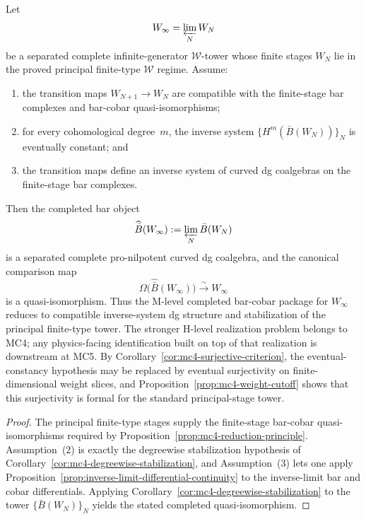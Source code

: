 \begin{proposition}
\label{prop:winfty-mc4-criterion}
Let
\[
W_\infty = \varprojlim_N W_N
\]
be a separated complete infinite-generator $\mathcal{W}$-tower whose
finite stages $W_N$ lie in the proved principal finite-type
$\mathcal{W}$ regime.  Assume:
\begin{enumerate}
\item the transition maps $W_{N+1} \to W_N$ are compatible with the
  finite-stage bar complexes and bar-cobar quasi-isomorphisms;
\item for every cohomological degree~$m$, the inverse system
  $\{H^m(\bar B(W_N))\}_N$ is eventually constant; and
\item the transition maps define an inverse system of curved dg
  coalgebras on the finite-stage bar complexes.
\end{enumerate}
Then the completed bar object
\[
\widehat{\bar B}(W_\infty) := \varprojlim_N \bar B(W_N)
\]
is a separated complete pro-nilpotent curved dg coalgebra, and the
canonical comparison map
\[
\Omega\bigl(\widehat{\bar B}(W_\infty)\bigr) \xrightarrow{\sim} W_\infty
\]
is a quasi-isomorphism.  Thus the M-level completed bar-cobar package
for $W_\infty$ reduces to compatible inverse-system dg structure and
stabilization of the principal finite-type tower.  The stronger H-level
realization problem belongs to MC4; any physics-facing identification
built on top of that realization is downstream at MC5.  By
Corollary~\ref{cor:mc4-surjective-criterion}, the eventual-constancy
hypothesis may be replaced by eventual surjectivity on finite-dimensional
weight slices, and Proposition~\ref{prop:mc4-weight-cutoff} shows that
this surjectivity is formal for the standard principal-stage tower.
\end{proposition}

\begin{proof}
The principal finite-type stages supply the finite-stage bar-cobar
quasi-isomorphisms required by
Proposition~\ref{prop:mc4-reduction-principle}.  Assumption~\textup{(2)}
is exactly the degreewise stabilization hypothesis of
Corollary~\ref{cor:mc4-degreewise-stabilization}, and
Assumption~\textup{(3)} lets one apply
Proposition~\ref{prop:inverse-limit-differential-continuity} to the
inverse-limit bar and cobar differentials.  Applying
Corollary~\ref{cor:mc4-degreewise-stabilization} to the tower
$\{\bar B(W_N)\}_N$ yields the stated completed quasi-isomorphism.
\end{proof}

